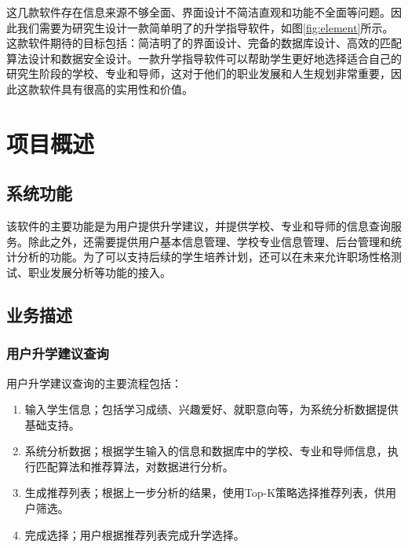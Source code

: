 \documentclass[UTF8]{ctexart}
\newcommand{\m}[1]{\textcolor{modify}{#1}}
\begin{document}
    \par
    这几款软件存在信息来源不够全面、界面设计不简洁直观和功能不全面等问题。因此我们需要为研究生设计一款简单明了的升学指导软件，如图\ref{fig:element}所示。这款软件期待的目标包括：简洁明了的界面设计、完备的数据库设计、高效的匹配算法设计和数据安全设计。\m{一款升学指导软件可以帮助学生更好地选择适合自己的研究生阶段的学校、专业和导师，这对于他们的职业发展和人生规划非常重要，因此这款软件具有很高的实用性和价值}。

    \section{项目概述}

    \subsection{系统功能}
    \par
    该软件的主要功能是为用户提供升学建议，并提供学校、专业和导师的信息查询服务。除此之外，还需要提供用户基本信息管理、学校专业信息管理、后台管理和统计分析的功能。为了可以支持后续的学生培养计划，还可以在未来允许职场性格测试、职业发展分析等功能的接入。

    \subsection{业务描述}

    \subsubsection{用户升学建议查询}

    \par
    用户升学建议查询的主要流程包括：
    \begin{enumerate}
        \item 输入学生信息；包括学习成绩、兴趣爱好、就职意向等，为系统分析数据提供基础支持。
        \item 系统分析数据；根据学生输入的信息和数据库中的学校、专业和导师信息，执行匹配算法和推荐算法，对数据进行分析。
        \item 生成推荐列表；根据上一步分析的结果，使用Top-K策略选择推荐列表，供用户筛选。
        \item 完成选择；用户根据推荐列表完成升学选择。
    \end{enumerate}
\end{document}
